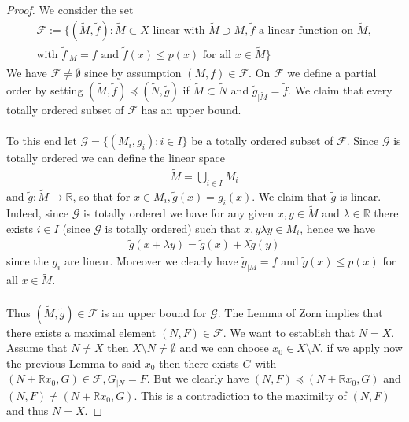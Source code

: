 \documentclass[11pt,a4paper]{article}
\theoremstyle{definition}
\begin{document}
\begin{proof}
We consider the set
\begin{align*}
\mathcal{F}:= \lbrace ( \widetilde{M}, \tilde{f}) : \widetilde{M} \subset X \text{ linear with } \widetilde{M} \supset M, \tilde{f} \text{ a linear function on } \widetilde{M}, \\ \text{with } \tilde{f}_{ \mid M} = f \text{ and } \tilde{f}(x) \leq p(x) \text{ for all } x \in \widetilde{M} \rbrace 
\end{align*}
We have $\mathcal{F} \neq \emptyset$ since by assumption $(M,f) \in \mathcal{F}$. On $\mathcal{F}$ we define a partial order by setting $(\widetilde{M}, \tilde{f}) \preceq ( \widetilde{N}, \tilde{g})$ if $\widetilde{M} \subset \widetilde{N}$ and $\tilde{g}_{ \mid \widetilde{M}} = \tilde{f}$. We claim that every totally ordered subset of $\mathcal{F}$ has an upper bound. \\
\\
To this end let $\mathcal{G}= \lbrace ( M_i, g_i): i \in I \rbrace$ be a totally ordered subset of $\mathcal{F}$. Since $\mathcal{G}$ is totally ordered we can define the linear space
\begin{align*}
\widetilde{M} = \bigcup_{i \in I} M_i
\end{align*}
and $\tilde{g}: \widetilde{M} \to \mathbb{R}$, so that for $x \in M_i, \tilde{g}(x)= g_i(x)$. We claim that $\tilde{g}$ is linear. Indeed, since $\mathcal{G}$ is totally ordered we have for any given $x,y \in \widetilde{M}$ and $\lambda \in \mathbb{R}$ there exists $i \in I$ (since $\mathcal{G}$ is totally ordered) such that $x,y \lambda y \in M_i$, hence we have 
\begin{align*}
\tilde{g}(x + \lambda y ) = \tilde{g}(x) + \lambda \tilde{g}(y)
\end{align*}
since the $g_i$ are linear. Moreover we clearly have $\tilde{g}_{ \mid M} = f$ and $\tilde{g}(x) \leq p(x)$ for all $x \in \widetilde{M}$. \\
\\
Thus $(\widetilde{M}, \tilde{g}) \in \mathcal{F}$ is an upper bound for $\mathcal{G}$. The Lemma of Zorn implies that there exists a maximal element $(N,F) \in \mathcal{F}$. We want to establish that $N=X$. Assume that $N \neq X$ then $X \setminus N \neq \emptyset$ and we can choose $x_0 \in X \setminus N$, if we apply now the previous Lemma to said $x_0$ then there exists $G$ with $(N+ \mathbb{R}x_0, G) \in \mathcal{F}, G_{ \mid N} = F$. But we clearly have $(N,F) \preceq (N + \mathbb{R}x_0, G)$ and $(N,F) \neq (N + \mathbb{R}x_0, G)$. This is a contradiction to the maximilty of $(N,F)$ and thus $N=X$.  
\end{proof}
\end{document}
